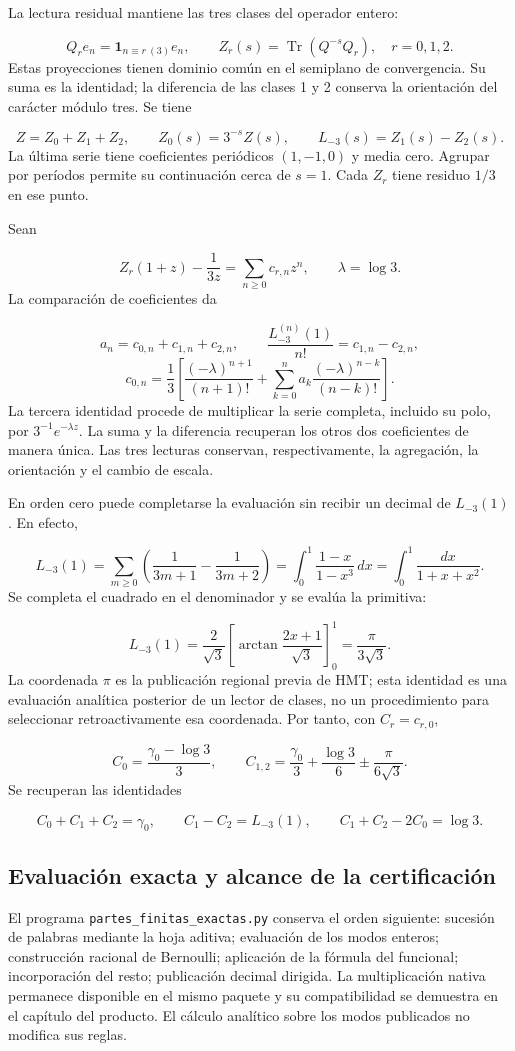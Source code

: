 La lectura residual mantiene las tres clases del operador entero:

\[
Q_re_n=\mathbf1_{n\equiv r\ (3)}e_n,\qquad
Z_r(s)=\operatorname{Tr}(Q^{-s}Q_r),\quad r=0,1,2.
\]
Estas proyecciones tienen dominio común en el semiplano de convergencia. Su suma es la identidad; la diferencia de las clases 1 y 2 conserva la orientación del carácter módulo tres. Se tiene

\[
Z=Z_0+Z_1+Z_2,\qquad Z_0(s)=3^{-s}Z(s),\qquad
L_{-3}(s)=Z_1(s)-Z_2(s).
\]
La última serie tiene coeficientes periódicos \((1,-1,0)\) y media cero. Agrupar por períodos permite su continuación cerca de \(s=1\). Cada \(Z_r\) tiene residuo \(1/3\) en ese punto.

Sean

\[
Z_r(1+z)-\frac1{3z}=\sum_{n\geq0}c_{r,n}z^n,
\qquad \lambda=\log3.
\]
La comparación de coeficientes da

\[
a_n=c_{0,n}+c_{1,n}+c_{2,n},\qquad
\frac{L_{-3}^{(n)}(1)}{n!}=c_{1,n}-c_{2,n},
\]
\[
c_{0,n}=\frac13\left[
\frac{(-\lambda)^{n+1}}{(n+1)!}
+\sum_{k=0}^na_k\frac{(-\lambda)^{n-k}}{(n-k)!}\right].
\]
La tercera identidad procede de multiplicar la serie completa, incluido su polo, por \(3^{-1}e^{-\lambda z}\). La suma y la diferencia recuperan los otros dos coeficientes de manera única. Las tres lecturas conservan, respectivamente, la agregación, la orientación y el cambio de escala.

En orden cero puede completarse la evaluación sin recibir un decimal de \(L_{-3}(1)\). En efecto,

\[
L_{-3}(1)=\sum_{m\geq0}\left(\frac1{3m+1}-\frac1{3m+2}\right)
=\int_0^1\frac{1-x}{1-x^3}\,dx
=\int_0^1\frac{dx}{1+x+x^2}.
\]
Se completa el cuadrado en el denominador y se evalúa la primitiva:

\[
L_{-3}(1)=\frac2{\sqrt3}
\left[\arctan\frac{2x+1}{\sqrt3}\right]_0^1
=\frac{\pi}{3\sqrt3}.
\]
La coordenada \(\pi\) es la publicación regional previa de HMT; esta identidad es una evaluación analítica posterior de un lector de clases, no un procedimiento para seleccionar retroactivamente esa coordenada. Por tanto, con \(C_r=c_{r,0}\),

\[
C_0=\frac{\gamma_0-\log3}{3},\qquad
C_{1,2}=\frac{\gamma_0}{3}+\frac{\log3}{6}
\mathbin{\pm}\frac{\pi}{6\sqrt3}.
\]
Se recuperan las identidades

\[
C_0+C_1+C_2=\gamma_0,\qquad
C_1-C_2=L_{-3}(1),\qquad C_1+C_2-2C_0=\log3.
\]
\clearpage
\subsection{Evaluación exacta y alcance de la certificación}
El programa \texttt{partes\_\allowbreak{}finitas\_\allowbreak{}exactas.\allowbreak{}py} conserva el orden siguiente: sucesión de palabras mediante la hoja aditiva; evaluación de los modos enteros; construcción racional de Bernoulli; aplicación de la fórmula del funcional; incorporación del resto; publicación decimal dirigida. La multiplicación nativa permanece disponible en el mismo paquete y su compatibilidad se demuestra en el capítulo del producto. El cálculo analítico sobre los modos publicados no modifica sus reglas.

